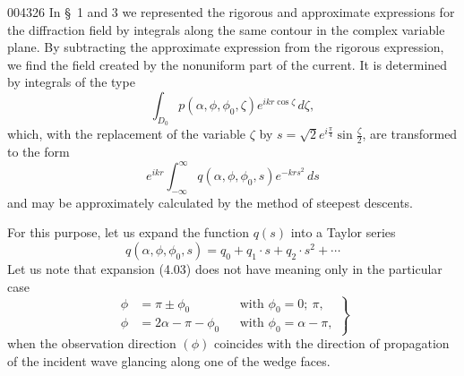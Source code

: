 \begin{scanpage}{0043}{26}
In \S\ 1 and 3 we represented the rigorous and approximate expressions for the diffraction field by integrals along the same contour in the complex variable plane. By subtracting the approximate expression from the rigorous expression, we find the field created by the nonuniform part of the current. It is determined by integrals of the type
\[\int_{D_0}p(\alpha,\phi,\phi_0,\zeta)e^{ikr\cos\zeta}\,d\zeta,\tag{4.01}\]
which, with the replacement of the variable $\zeta$ by $s=\sqrt2e^{i\frac\pi4}\sin\frac\zeta2$, are transformed to the form
\[e^{ikr}\int_{-\infty}^{\infty}q(\alpha,\phi,\phi_0,s)e^{-krs^2}\,ds\tag{4.02}\]
and may be approximately calculated by the method of steepest descents.

For this purpose, let us expand the function $q(s)$ into a Taylor series
\[q(\alpha,\phi,\phi_0,s)=q_0+q_1\cdot s+q_2\cdot s^2+\cdots\tag{4.03}\]
Let us note that expansion (4.03) does not have meaning only in the particular case
\[\left.\begin{aligned}\phi&=\pi\pm\phi_0&&\text{with }\phi_0=0;\ \pi,\\\phi&=2\alpha-\pi-\phi_0&&\text{with }\phi_0=\alpha-\pi,\end{aligned}\right\}\tag{4.04}\]
when the observation direction $(\phi)$ coincides with the direction of propagation of the incident wave glancing along one of the wedge faces.
\end{scanpage}
